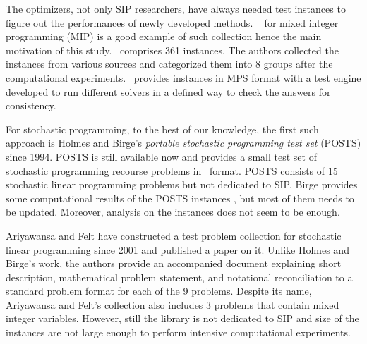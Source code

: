 The optimizers, not only SIP researchers, have always needed test instances to figure out the performances of newly developed methods. \miplib\ \cite{MIPLIB} for mixed integer programming (MIP) is a good example of such collection hence the main motivation of this study. \miplib\ comprises 361 instances. The authors collected the instances from various sources and categorized them into 8 groups after the computational experiments. \miplib\ provides instances in \textsf{MPS} format with a test engine developed to run different solvers in a defined way to check the answers for consistency. 

For stochastic programming, to the best of our knowledge, the first such approach is Holmes and Birge's \textit{portable stochastic programming test set} (POSTS) \cite{POSTS} since 1994. POSTS is still available now and provides a small test set of stochastic programming recourse problems in \smps\ format. POSTS consists of 15 stochastic linear programming problems but not dedicated to SIP. Birge provides some computational results of the POSTS instances \cite{POSTSresults}, but most of them needs to be updated. Moreover, analysis on the instances does not seem to be enough. 

Ariyawansa and Felt \cite{AF2004} have constructed a test problem collection for stochastic linear programming since 2001 and published a paper on it. Unlike Holmes and Birge's work, the authors provide an accompanied document explaining short description, mathematical problem statement, and notational reconciliation to a standard problem format for each of the 9 problems. Despite its name, Ariyawansa and Felt's collection also includes 3 problems that contain mixed integer variables. However, still the library is not dedicated to SIP and size of the instances are not large enough to perform intensive computational experiments. 


